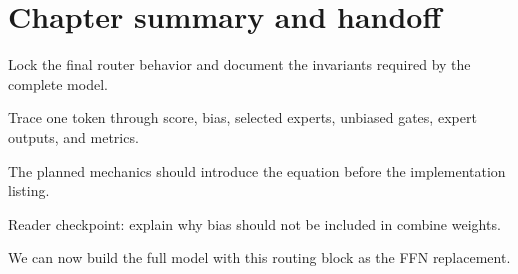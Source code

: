 \section{Chapter summary and handoff}
\label{sec:ch09-chapter-summary-and-handoff}

Lock the final router behavior and document the invariants required by the complete model.



Trace one token through score, bias, selected experts, unbiased gates, expert outputs, and metrics.



The planned mechanics should introduce the equation before the implementation listing.





\begin{checkpointbox}
Reader checkpoint: explain why bias should not be included in combine weights.
\end{checkpointbox}

We can now build the full model with this routing block as the FFN replacement.
